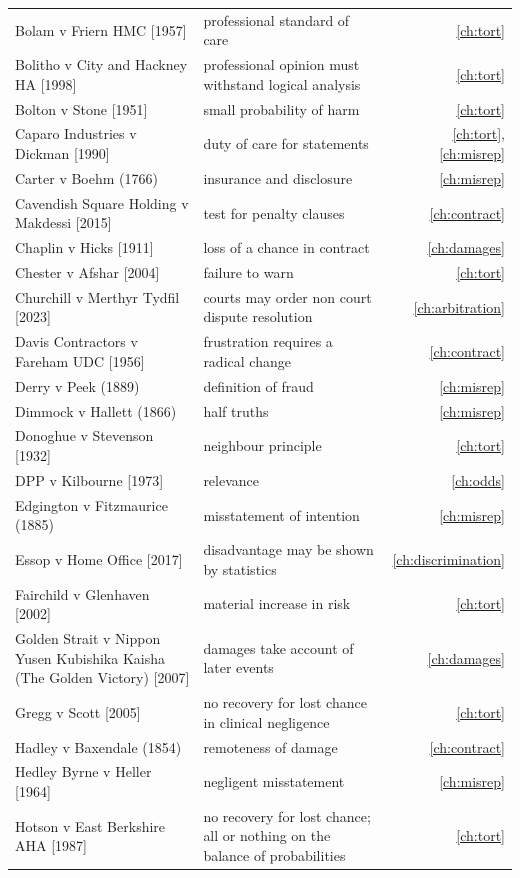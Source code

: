\begin{longtable}{>{\raggedright\arraybackslash}p{3.7cm} >{\raggedright\arraybackslash}p{5.6cm} r}
Bolam v Friern HMC [1957] & professional standard of care & \ref{ch:tort}\\
Bolitho v City and Hackney HA [1998] & professional opinion must withstand logical analysis & \ref{ch:tort}\\
Bolton v Stone [1951] & small probability of harm & \ref{ch:tort}\\
Caparo Industries v Dickman [1990] & duty of care for statements & \ref{ch:tort}, \ref{ch:misrep}\\
Carter v Boehm (1766) & insurance and disclosure & \ref{ch:misrep}\\
Cavendish Square Holding v Makdessi [2015] & test for penalty clauses & \ref{ch:contract}\\
Chaplin v Hicks [1911] & loss of a chance in contract & \ref{ch:damages}\\
Chester v Afshar [2004] & failure to warn & \ref{ch:tort}\\
Churchill v Merthyr Tydfil [2023] & courts may order non court dispute resolution & \ref{ch:arbitration}\\
Davis Contractors v Fareham UDC [1956] & frustration requires a radical change & \ref{ch:contract}\\
Derry v Peek (1889) & definition of fraud & \ref{ch:misrep}\\
Dimmock v Hallett (1866) & half truths & \ref{ch:misrep}\\
Donoghue v Stevenson [1932] & neighbour principle & \ref{ch:tort}\\
DPP v Kilbourne [1973] & relevance & \ref{ch:odds}\\
Edgington v Fitzmaurice (1885) & misstatement of intention & \ref{ch:misrep}\\
Essop v Home Office [2017] & disadvantage may be shown by statistics & \ref{ch:discrimination}\\
Fairchild v Glenhaven [2002] & material increase in risk & \ref{ch:tort}\\
Golden Strait v Nippon Yusen Kubishika Kaisha (The Golden Victory) [2007] & damages take account of later events & \ref{ch:damages}\\
Gregg v Scott [2005] & no recovery for lost chance in clinical negligence & \ref{ch:tort}\\
Hadley v Baxendale (1854) & remoteness of damage & \ref{ch:contract}\\
Hedley Byrne v Heller [1964] & negligent misstatement & \ref{ch:misrep}\\
Hotson v East Berkshire AHA [1987] & no recovery for lost chance; all or nothing on the balance of probabilities & \ref{ch:tort}\\

\end{longtable}
